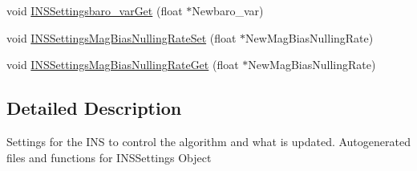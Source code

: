 \begin{DoxyCompactItemize}
\item 
void \hyperlink{group___i_n_s_settings_ga837abf284f4cdb1f092ac78893cb0704}{\-I\-N\-S\-Settingsbaro\-\_\-var\-Get} (float $\ast$\-Newbaro\-\_\-var)
\item 
void \hyperlink{group___i_n_s_settings_ga16f214439ef2d21b04c4296cf2555330}{\-I\-N\-S\-Settings\-Mag\-Bias\-Nulling\-Rate\-Set} (float $\ast$\-New\-Mag\-Bias\-Nulling\-Rate)
\item 
void \hyperlink{group___i_n_s_settings_ga176c63adcc12e6ec2fe450da0c25e698}{\-I\-N\-S\-Settings\-Mag\-Bias\-Nulling\-Rate\-Get} (float $\ast$\-New\-Mag\-Bias\-Nulling\-Rate)
\end{DoxyCompactItemize}


\subsection{\-Detailed \-Description}
\-Settings for the \-I\-N\-S to control the algorithm and what is updated. \-Autogenerated files and functions for \-I\-N\-S\-Settings \-Object 

